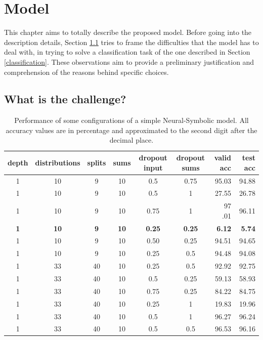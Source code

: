 \chapter{Model}
\label{Chapter3}
This chapter aims to totally describe the proposed model. Before going into the description details, Section \ref{challenge} tries to frame the difficulties that the model has to deal with, in trying to solve a classification task of the one described in Section \ref{classification}. These observations aim to provide a preliminary justification and comprehension of the reasons behind specific choices.

\section{What is the challenge?}
\label{challenge}
\begin{table}[H]
  \centering
  \caption{Performance of some configurations of a simple Neural-Symbolic model. All accuracy values are in percentage and approximated to the second digit after the decimal place.}
  \label{tab:simple-model}
  \scriptsize
  \begin{tabular}{ccccccrr}
    \toprule
    depth		& distributions 			& splits 		& sums 				& dropout input 		& dropout sums 			& valid acc 			& test acc\\
    \midrule
    1			& 10						& 9 			& 10 				& 0.5 					& 0.75 					& 95.03 				& 94.88\\
	1			& 10						& 9 			& 10 				& 0.5 					& 1 					& 27.55 				& 26.78\\
	1			& 10						& 9 			& 10 				& 0.75 					& 1 					& 97 .01				& 96.11\\
	\textbf{1}	& \textbf{10}				& \textbf{9} 	& \textbf{10} 		& \textbf{0.25} 		& \textbf{0.25} 		& \textbf{6.12} 		& \textbf{5.74}\\
	1			& 10						& 9 			& 10 				& 0.50 					& 0.25 					& 94.51 				& 94.65\\
	1			& 10						& 9 			& 10 				& 0.25 					& 0.5 					& 94.48 				& 94.08\\
	1			& 33						& 40 			& 10 				& 0.25 					& 0.5 					& 92.92 				& 92.75\\
	1			& 33						& 40 			& 10 				& 0.5 					& 0.25 					& 59.13 				& 58.93\\
	1			& 33						& 40 			& 10 				& 0.75 					& 0.25 					& 84.22 				& 84.75\\
	1			& 33						& 40 			& 10 				& 0.25 					& 1 					& 19.83 				& 19.96\\
    1			& 33						& 40 			& 10 				& 0.5 					& 1 					& 96.27 				& 96.24\\
	1			& 33						& 40 			& 10 				& 0.5 					& 0.5 					& 96.53 				& 96.16\\
    \bottomrule
  \end{tabular}
\end{table}
